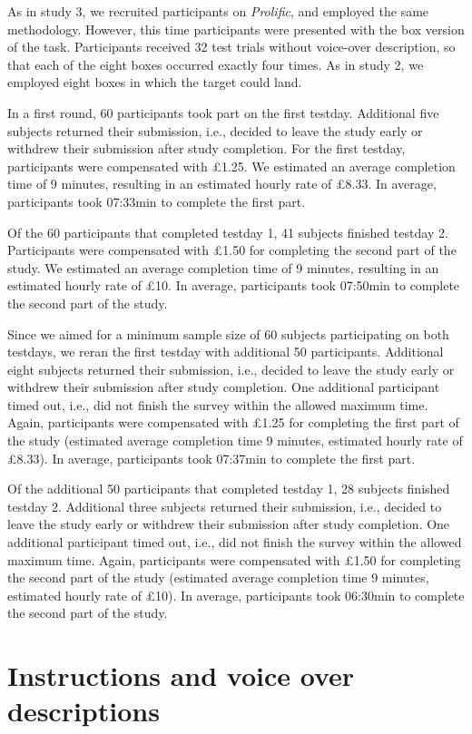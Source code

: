 \documentclass[
  man,floatsintext]{apa6}
\begin{document}
As in study 3, we recruited participants on \emph{Prolific}, and employed the same methodology. However, this time participants were presented with the box version of the task. Participants received 32 test trials without voice-over description, so that each of the eight boxes occurred exactly four times. As in study 2, we employed eight boxes in which the target could land.

In a first round, 60 participants took part on the first testday. Additional five subjects returned their submission, i.e., decided to leave the study early or withdrew their submission after study completion. For the first testday, participants were compensated with £1.25. We estimated an average completion time of 9 minutes, resulting in an estimated hourly rate of £8.33. In average, participants took 07:33min to complete the first part.

Of the 60 participants that completed testday 1, 41 subjects finished testday 2. Participants were compensated with £1.50 for completing the second part of the study. We estimated an average completion time of 9 minutes, resulting in an estimated hourly rate of £10. In average, participants took 07:50min to complete the second part of the study.

Since we aimed for a minimum sample size of 60 subjects participating on both testdays, we reran the first testday with additional 50 participants. Additional eight subjects returned their submission, i.e., decided to leave the study early or withdrew their submission after study completion. One additional participant timed out, i.e., did not finish the survey within the allowed maximum time. Again, participants were compensated with £1.25 for completing the first part of the study (estimated average completion time 9 minutes, estimated hourly rate of £8.33). In average, participants took 07:37min to complete the first part.

Of the additional 50 participants that completed testday 1, 28 subjects finished testday 2. Additional three subjects returned their submission, i.e., decided to leave the study early or withdrew their submission after study completion. One additional participant timed out, i.e., did not finish the survey within the allowed maximum time. Again, participants were compensated with £1.50 for completing the second part of the study (estimated average completion time 9 minutes, estimated hourly rate of £10). In average, participants took 06:30min to complete the second part of the study.

\hypertarget{instructions-and-voice-over-descriptions}{%
\section{Instructions and voice over descriptions}\label{instructions-and-voice-over-descriptions}}
\end{document}
